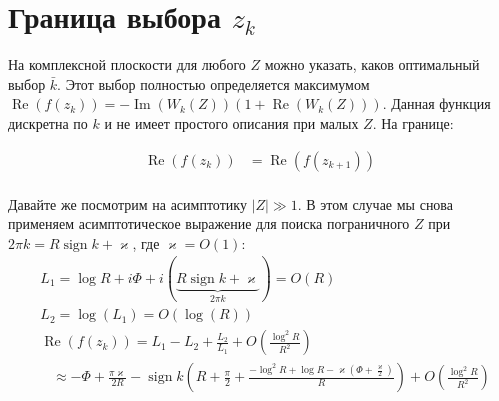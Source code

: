 \documentclass[a4paper, 12pt]{article}
\DeclareMathOperator*{\sign}{sign}
\DeclareMathOperator*{\Real}{Re}
\DeclareMathOperator*{\Imag}{Im}
\begin{document}
\section*{Граница выбора $z_k$}
На комплексной плоскости для любого $Z$ можно указать, каков оптимальный выбор $\bar{k}$. Этот выбор полностью определяется максимумом $\Real\left(f(z_k)\right) = -\Imag(W_k(Z))\left(1+\Real(W_k(Z))\right)$. 
Данная функция дискретна по $k$ и не имеет простого описания при малых $Z$. На границе:

\begin{equation}
\begin{aligned}
    \Real\left(f(z_k)\right) &= \Real\left(f(z_{k+1})\right) \\
\end{aligned}
\end{equation}

Давайте же посмотрим на асимптотику $|Z|\gg 1$. В этом случае мы снова применяем асимптотическое выражение для поиска пограничного $Z$ при $2\pi k= R\sign k + \varkappa$, где $\varkappa = O(1)$:
\begin{equation}
\begin{aligned}
    &L_1 = \log R + i \Phi + i\left(\underbrace{R\sign k + \varkappa}_{2\pi k}\right) = O(R)\\
    &L_2 = \log(L_1) = O(\log(R))\\
    &\Real\left(f(z_k)\right) = L_1 - L_2 + \frac{L_2}{L_1} + O\left(\frac{\log^2 R}{R^2}\right)\\
    &\;\;\;\approx -\Phi + \frac{\pi \varkappa}{2R} - \sign k 
    \left(R + \frac{\pi}{2} + \frac{-\log^2 R + \log R - \varkappa\left(\Phi + \frac{\varkappa}{2}\right)}{R}\right) +
     O\left(\frac{\log^2 R}{R^2}\right)
\end{aligned}
\end{equation}
\end{document}
